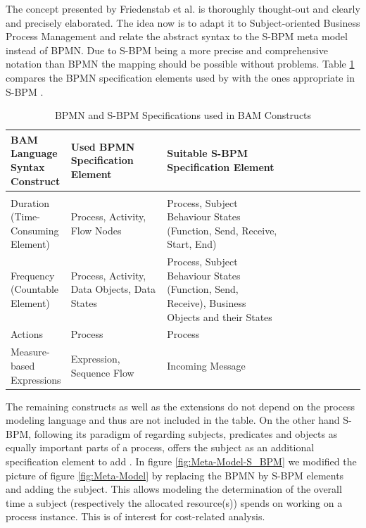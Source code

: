 The concept presented by Friedenstab et al. is thoroughly thought-out and clearly and precisely elaborated. The idea now is to adapt it to Subject-oriented Business Process Management and relate the abstract syntax to the S-BPM meta model instead of BPMN. Due to S-BPM being a more precise and comprehensive notation than BPMN \cite{article:BPMNYAWLPatterns} the mapping should be possible without problems. Table \ref{tbl:MonBPMNSBPM} compares the BPMN specification elements used by \cite{article:BPMNActivityMon} with the ones appropriate in S-BPM \cite{Flei12}.


\begin{table}[htbp]
	\footnotesize
	\centering
	\begin{tabular}[t]{@{}l p{0.3\linewidth} p{0.4\linewidth} p{0.5\linewidth} @{}}
	\toprule
	\textbf{BAM Language Syntax Construct} & \textbf{Used BPMN Specification Element}  & \textbf{Suitable S-BPM Specification Element}\\
	\midrule\\
	Duration (Time-Consuming Element) &	Process, Activity, Flow Nodes&	Process, Subject Behaviour States (Function, Send, Receive, Start, End)
	\\
	Frequency
	(Countable Element)&	Process, Activity, Data Objects, Data States &	Process, Subject Behaviour States (Function, Send, Receive), Business Objects and their States 
	\\
	Actions &	Process	 & Process
	\\
	Measure-based Expressions &	Expression, Sequence Flow &	Incoming Message
	\\
	\bottomrule
\end{tabular}
\caption{BPMN and S-BPM Specifications used in BAM Constructs}
\label{tbl:MonBPMNSBPM}
\end{table}

The remaining constructs as well as the extensions do not depend on the process modeling language and thus are not included in the table.
On the other hand S-BPM, following its paradigm of regarding subjects, predicates and objects as equally important parts of a process, offers the subject as an additional specification element to add . In figure \ref{fig:Meta-Model-S_BPM} we modified the picture of figure \ref{fig:Meta-Model} by replacing the BPMN by S-BPM elements and adding the subject. This allows modeling the determination of the overall time a subject (respectively the allocated resource(s)) spends on working on a process instance. This is of interest for cost-related analysis.


